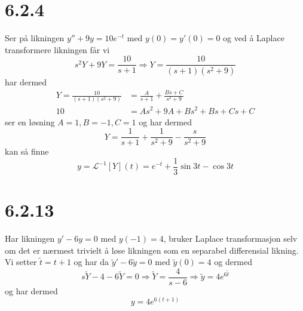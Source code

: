 \documentclass{report}
\newcommand{\nbrack}[1]{\left( #1 \right)}
\newcommand{\bbrack}[1]{\left[ #1 \right]}
\newcommand{\iLplc}[1]{\mathscr{L}^{-1}\bbrack{ #1 } (t)}
\begin{document}
\section*{6.2.4}
Ser på likningen $y'' + 9y = 10e^{-t}$ med $y(0) = y'(0) = 0$ og ved å Laplace transformere likningen får vi
\begin{equation}
  \label{eq:15}
  s^{2} Y + 9Y = \frac{10}{s+1} \Rightarrow Y = \frac{10}{\nbrack{s+1} \nbrack{s^{2}+9}}
\end{equation}
har dermed
\begin{equation}
  \label{eq:16}
  \begin{split}
    Y = \frac{10}{\nbrack{s+1} \nbrack{s^{2}+9}} &= \frac{A}{s+1} + \frac{Bs + C}{s^{2} + 9} \\
    10 &= As^{2} + 9A + Bs^{2} + Bs + Cs + C
  \end{split}
\end{equation}
ser en løsning $A=1, B=-1, C=1$ og har dermed
\begin{equation}
  \label{eq:17}
  Y = \frac{1}{s+1} + \frac{1}{s^{2} + 9} - \frac{s}{s^{2} + 9}
\end{equation}
kan så finne
\begin{equation}
  \label{eq:18}
  y = \iLplc{Y} = e^{-t} + \frac{1}{3} \sin 3t - \cos 3t
\end{equation}



\section*{6.2.13}
Har likningen $y' - 6y = 0$ med $y(-1) = 4$, bruker Laplace transformasjon selv om det er nærmest trivielt å løse likningen som en separabel differensial likning. Vi setter $\tilde t = t + 1$ og har da $\tilde y' - 6\tilde y = 0$ med $\tilde y (0) = 4$ og dermed
\begin{equation}
  \label{eq:20}
  s \tilde Y - 4 - 6 \tilde Y = 0 \Rightarrow \tilde Y = \frac{4}{s-6} \Rightarrow \tilde y = 4e^{6\tilde t}
\end{equation}
og har dermed
\begin{equation}
  \label{eq:21}
  y = 4e^{6(t+1)}
\end{equation}
\end{document}
